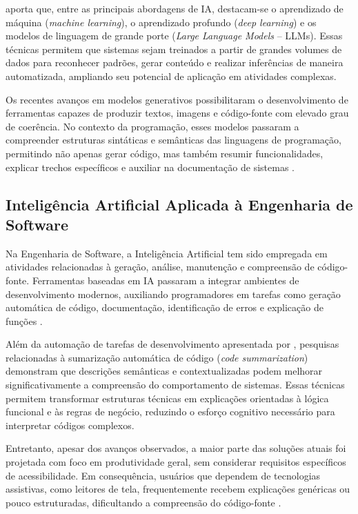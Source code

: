 \documentclass[
    12pt,                   %
    openright,              %
    oneside,                %
    a4paper,                %
    sumario=tradicional,    %
    english,                %
    brazil,                 %
    ]{abntex2}
\begin{document}
\textcite{latinoware34224} aporta que, entre as principais abordagens de IA, destacam-se o aprendizado de máquina (\textit{machine learning}), o aprendizado profundo (\textit{deep learning}) e os modelos de linguagem de grande porte (\textit{Large Language Models} -- LLMs). Essas técnicas permitem que sistemas sejam treinados a partir de grandes volumes de dados para reconhecer padrões, gerar conteúdo e realizar inferências de maneira automatizada, ampliando seu potencial de aplicação em atividades complexas.

Os recentes avanços em modelos generativos possibilitaram o desenvolvimento de ferramentas capazes de produzir textos, imagens e código-fonte com elevado grau de coerência. No contexto da programação, esses modelos passaram a compreender estruturas sintáticas e semânticas das linguagens de programação, permitindo não apenas gerar código, mas também resumir funcionalidades, explicar trechos específicos e auxiliar na documentação de sistemas \cite{latinoware34224}.

\subsection{Inteligência Artificial Aplicada à Engenharia de Software}\label{sec:IAES}

Na Engenharia de Software, a Inteligência Artificial tem sido empregada em atividades relacionadas à geração, análise, manutenção e compreensão de código-fonte. Ferramentas baseadas em IA passaram a integrar ambientes de desenvolvimento modernos, auxiliando programadores em tarefas como geração automática de código, documentação, identificação de erros e explicação de funções \cite{latinoware34224}.

Além da automação de tarefas de desenvolvimento apresentada por \textcite{latinoware34224}, pesquisas relacionadas à sumarização automática de código (\textit{code summarization}) demonstram que descrições semânticas e contextualizadas podem melhorar significativamente a compreensão do comportamento de sistemas. Essas técnicas permitem transformar estruturas técnicas em explicações orientadas à lógica funcional e às regras de negócio, reduzindo o esforço cognitivo necessário para interpretar códigos complexos.

Entretanto, apesar dos avanços observados, a maior parte das soluções atuais foi projetada com foco em produtividade geral, sem considerar requisitos específicos de acessibilidade. Em consequência, usuários que dependem de tecnologias assistivas, como leitores de tela, frequentemente recebem explicações genéricas ou pouco estruturadas, dificultando a compreensão do código-fonte \cite{latinoware34224}.
\end{document}
